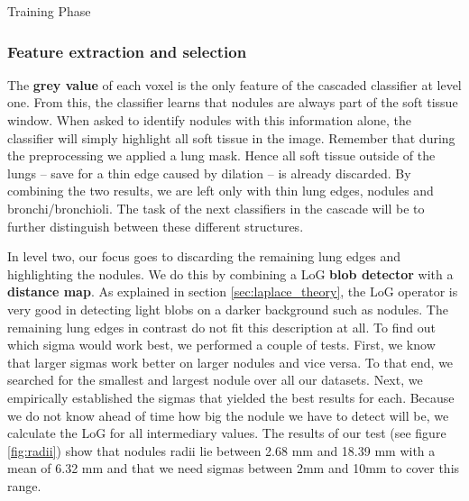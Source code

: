 \begin{algorithm}[htp]
	\DontPrintSemicolon
	\caption{Training Phase\label{alg:train}}
\end{algorithm}

\subsubsection{Feature extraction and selection} \label{sec:featureExtraction}
The \textbf{grey value} of each voxel is the only feature of the cascaded
classifier at level one. From this, the classifier learns that nodules are
always part of the soft tissue window. When asked to identify nodules with this
information alone, the classifier will simply highlight all soft tissue in the
image. Remember that during the preprocessing we applied a lung mask. Hence all
soft tissue outside of the lungs -- save for a thin edge caused by dilation --
is already discarded. By combining the two results, we are left only with thin
lung edges, nodules and bronchi/bronchioli. The task of the next classifiers in
the cascade will be to further distinguish between these different structures.

In level two, our focus goes to discarding the remaining lung edges and
highlighting the nodules. We do this by combining a LoG \textbf{blob detector}
with a \textbf{distance map}. As explained in section \ref{sec:laplace_theory},
the LoG operator is very good in detecting light blobs on a darker background
such as nodules. The remaining lung edges in contrast do not fit this
description at all. To find out which sigma would work best, we performed a
couple of tests. First, we know that larger sigmas work better on larger nodules
and vice versa. To that end, we searched for the smallest and largest nodule
over all our datasets. Next, we empirically established the sigmas that yielded
the best results for each. Because we do not know ahead of time how big the
nodule we have to detect will be, we calculate the LoG for all intermediary
values. The results of our test (see figure \ref{fig:radii}) show that nodules
radii lie between 2.68 mm and 18.39 mm with a mean of 6.32 mm and that
we need sigmas between 2mm and 10mm to cover this range.

